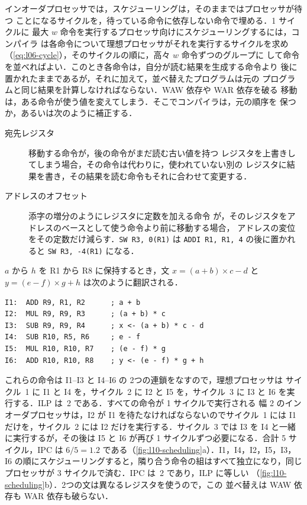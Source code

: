 \documentclass[../main.tex]{subfiles}
\begin{document}
インオーダプロセッサでは，スケジューリングは，そのままではプロセッサが待つ
ことになるサイクルを，待っている命令に依存しない命令で埋める．1 サイクルに
最大 $w$ 命令を実行するプロセッサ向けにスケジューリングするには，コンパイラ
は各命令について理想プロセッサがそれを実行するサイクルを求め
（\cref{eq:l06-cycle}），そのサイクルの順に，高々 $w$ 命令ずつのグループに
して命令を並べればよい．このとき各命令は，自分が読む結果を生成する命令より
後に置かれたままであるが，それに加えて，並べ替えたプログラムは元の
プログラムと同じ結果を計算しなければならない．WAW 依存や WAR 依存を破る
移動は，ある命令が使う値を変えてしまう．そこでコンパイラは，元の順序を
保つか，あるいは次のように補正する．
\begin{description}
  \item[宛先レジスタ] 移動する命令が，後の命令がまだ読む古い値を持つ
    レジスタを上書きしてしまう場合，その命令は代わりに，使われていない別の
    レジスタに結果を書き，その結果を読む命令もそれに合わせて変更する．
  \item[アドレスのオフセット] 添字の増分のようにレジスタに定数を加える命令
    が，そのレジスタをアドレスのベースとして使う命令より前に移動する場合，
    アドレスの変位をその定数だけ減らす．\texttt{SW R3, 0(R1)} は
    \texttt{ADDI R1, R1, 4} の後に置かれると \texttt{SW R3, -4(R1)} になる．%
\end{description}

\begin{example}
  \label{ex:l10-scheduling}
  $a$ から $h$ を R1 から R8 に保持するとき，文 $x = (a+b)\times c - d$ と
  $y = (e-f)\times g + h$ は次のように翻訳される．
  \begin{lstlisting}[language={[x86masm]Assembler}, numbers=none]
I1:  ADD R9, R1, R2      ; a + b
I2:  MUL R9, R9, R3      ; (a + b) * c
I3:  SUB R9, R9, R4      ; x <- (a + b) * c - d
I4:  SUB R10, R5, R6     ; e - f
I5:  MUL R10, R10, R7    ; (e - f) * g
I6:  ADD R10, R10, R8    ; y <- (e - f) * g + h
\end{lstlisting}
  これらの命令は I1--I3 と I4--I6 の 2つの連鎖をなすので，理想プロセッサは
  サイクル~1 に I1 と I4 を，サイクル~2 に I2 と I5 を，サイクル~3 に I3 と
  I6 を実行する．ILP は~2 である．すべての命令が 1 サイクルで実行される
  幅 2 のインオーダプロセッサは，I2 が I1
  を待たなければならないのでサイクル~1 には I1 だけを，サイクル~2 には I2
  だけを実行する．サイクル~3 では I3 を I4 と一緒に実行するが，その後は
  I5 と I6 が再び 1 サイクルずつ必要になる．合計 5 サイクル，IPC は
  $6/5 = 1.2$ である（\cref{fig:l10-scheduling}a）．I1，I4，I2，I5，I3，I6
  の順にスケジューリングすると，隣り合う命令の組はすべて独立になり，同じ
  プロセッサが 3 サイクルで済む．IPC は~2 であり，ILP に等しい
  （\cref{fig:l10-scheduling}b）．2つの文は異なるレジスタを使うので，この
  並べ替えは WAW 依存も WAR 依存も破らない．
\end{example}
\end{document}
